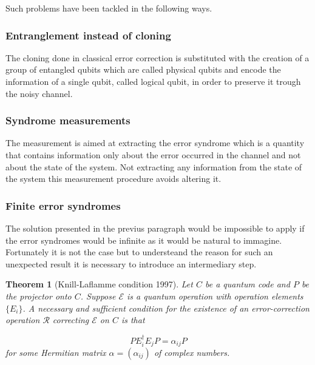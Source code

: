 \documentclass{article}
\newtheorem{theorem}{Theorem}
\begin{document}
Such problems have been tackled in the following ways.

\subsubsection{Entranglement instead of cloning}

The cloning done in classical error correction is substituted with
the creation of a group of entangled qubits which are called physical qubits
and encode the information of a single qubit, called logical qubit,  in order
to preserve it trough the noisy channel.


\subsubsection{Syndrome measurements}

The measurement is aimed at extracting the error syndrome which
is a quantity that contains information only about the error occurred
in the channel and not about the state of the system.
Not extracting any information from the state of the system
this measurement procedure avoids altering it.



\subsubsection{Finite error syndromes}

The solution presented in the previus paragraph would be impossible to
apply if the error syndromes would be infinite as it would be natural to
immagine.
Fortunately it is not the case but to understeand the reason for such
an unexpected result it is necessary to introduce an intermediary step.

\begin{theorem}[Knill-Laflamme condition 1997]
	\label{conditions}
	Let $C$ be a quantum code and $P$ be the projector onto $C$.
	Suppose $\mathcal{E}$ is a quantum operation with operation elements $\{E_i\}$.
	A necessary and sufficient condition for the existence of an error-correction
	operation $\mathcal{R}$ correcting $\mathcal{E}$ on $C$ is that

	\begin{equation}
		P E_i^\dagger E_j P = \alpha_{ij} P
		\label{eccondition}
	\end{equation}
	for some Hermitian matrix $\alpha = (\alpha_{ij})$ of complex numbers.
\end{theorem}
\end{document}
